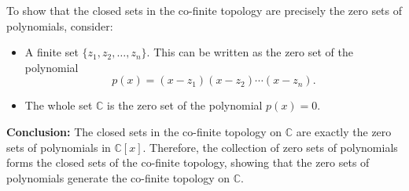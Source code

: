 To show that the closed sets in the co-finite topology are precisely the zero sets of polynomials, consider:
\begin{itemize}
	\item A finite set \(\{z_1, z_2, \ldots, z_n\}\). This can be written as the zero set of the polynomial
	\[
	p(x) = (x - z_1)(x - z_2) \cdots (x - z_n).
	\]
	\item The whole set \(\mathbb{C}\) is the zero set of the polynomial \(p(x) = 0\).
\end{itemize}

\textbf{Conclusion:} The closed sets in the co-finite topology on \(\mathbb{C}\) are exactly the zero sets of polynomials in \(\mathbb{C}[x]\). Therefore, the collection of zero sets of polynomials forms the closed sets of the co-finite topology, showing that the zero sets of polynomials generate the co-finite topology on \(\mathbb{C}\).

\newpage


%	
%	
%
%	
%	

